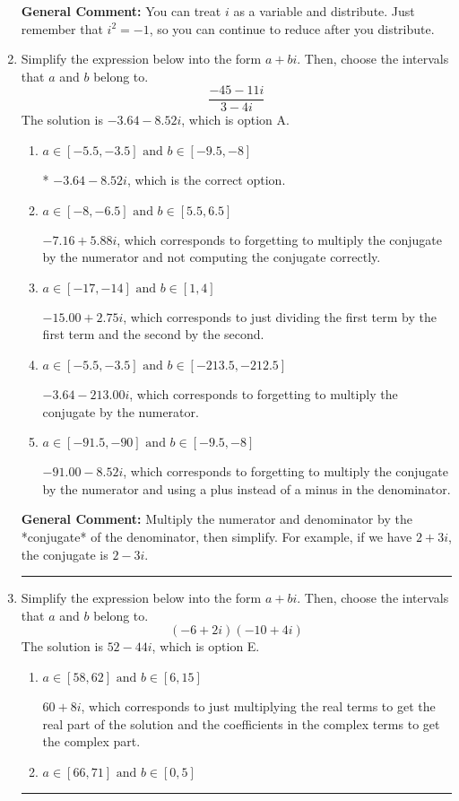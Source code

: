 \documentclass{extbook}[14pt]
\newcommand{\litem}[1]{\item #1

\rule{\textwidth}{0.4pt}}
\begin{document}
\begin{enumerate}
{\textbf{General Comment:} You can treat $i$ as a variable and distribute. Just remember that $i^2=-1$, so you can continue to reduce after you distribute.
}
\litem{
Simplify the expression below into the form $a+bi$. Then, choose the intervals that $a$ and $b$ belong to.
\[ \frac{-45 - 11 i}{3 - 4 i} \]The solution is \( -3.64  - 8.52 i \), which is option A.\begin{enumerate}[label=\Alph*.]
\item \( a \in [-5.5, -3.5] \text{ and } b \in [-9.5, -8] \)

* $-3.64  - 8.52 i$, which is the correct option.
\item \( a \in [-8, -6.5] \text{ and } b \in [5.5, 6.5] \)

 $-7.16  + 5.88 i$, which corresponds to forgetting to multiply the conjugate by the numerator and not computing the conjugate correctly.
\item \( a \in [-17, -14] \text{ and } b \in [1, 4] \)

 $-15.00  + 2.75 i$, which corresponds to just dividing the first term by the first term and the second by the second.
\item \( a \in [-5.5, -3.5] \text{ and } b \in [-213.5, -212.5] \)

 $-3.64  - 213.00 i$, which corresponds to forgetting to multiply the conjugate by the numerator.
\item \( a \in [-91.5, -90] \text{ and } b \in [-9.5, -8] \)

 $-91.00  - 8.52 i$, which corresponds to forgetting to multiply the conjugate by the numerator and using a plus instead of a minus in the denominator.
\end{enumerate}

\textbf{General Comment:} Multiply the numerator and denominator by the *conjugate* of the denominator, then simplify. For example, if we have $2+3i$, the conjugate is $2-3i$.
}
\litem{
Simplify the expression below into the form $a+bi$. Then, choose the intervals that $a$ and $b$ belong to.
\[ (-6 + 2 i)(-10 + 4 i) \]The solution is \( 52 - 44 i \), which is option E.\begin{enumerate}[label=\Alph*.]
\item \( a \in [58, 62] \text{ and } b \in [6, 15] \)

 $60 + 8 i$, which corresponds to just multiplying the real terms to get the real part of the solution and the coefficients in the complex terms to get the complex part.
\item \( a \in [66, 71] \text{ and } b \in [0, 5] \)


\end{enumerate}}
\end{enumerate}
\end{document}
